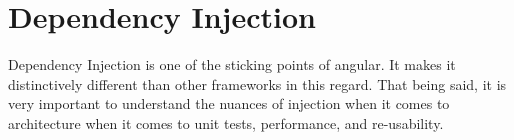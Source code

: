 \maketitle{}
\section{ Dependency Injection }

Dependency Injection is one of the sticking points of angular. It makes it
distinctively different than other frameworks in this regard. That being said,
it is very important to understand the nuances of injection when it comes to
architecture when it comes to unit tests, performance, and re-usability. 
